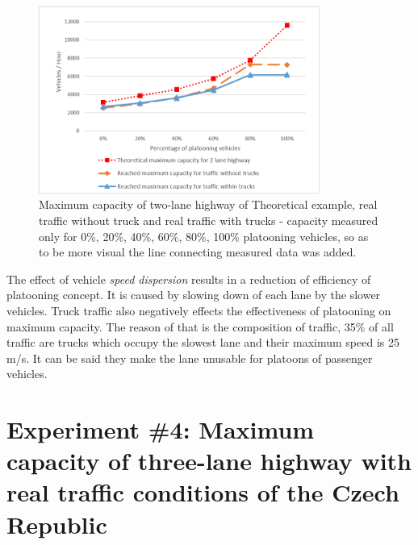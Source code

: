 \begin{figure}[ph]
\centering
\includegraphics[width=0.82\textwidth,height=0.82\textheight,keepaspectratio]{figures/Chapter_5/5_E3_maxCap.png}
\centering
\protect\caption[Maximum capacity of two-lane highway of Theoretical example, real traffic without truck and real traffic with trucks]{\label{fig:5_3-4}Maximum capacity of two-lane highway of Theoretical example, real traffic without truck and real traffic with trucks - capacity measured only for 0\%, 20\%, 40\%, 60\%, 80\%, 100\% platooning vehicles, so as to be more visual the line connecting measured data was added.}
\end{figure}

The effect of vehicle \textit{speed dispersion} results in a reduction of efficiency of platooning concept. It is caused by slowing down of each lane by the slower vehicles. Truck traffic also negatively effects the effectiveness of platooning on maximum capacity. The reason of that is the composition of traffic, 35\% of all traffic are trucks which occupy the slowest lane and their maximum speed is 25 m/s. It can be said they make the lane unusable for platoons of passenger vehicles.














\section[Experiment \#4: Maximum capacity of three-lane highway with real traffic conditions of the Czech Republic]{Experiment \#4: Maximum capacity of three-lane highway with real traffic conditions of the Czech Republic}

